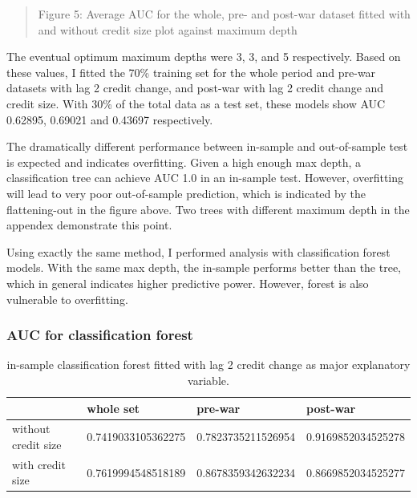\documentclass{article}
\newcommand{\ciapdf}[1]{\vspace*{-\parskip}\begin{center}\resizebox{0.75\textwidth}{!}{\texttt{[image: \#1]}}\end{center}}
\begin{document}
\ciapdf{Figure_6.pdf}
\begin{quote}
Figure 5: Average AUC for the whole, pre- and post-war dataset fitted
with and without credit size plot against maximum depth
\end{quote}

The eventual optimum maximum depths were 3, 3, and 5 respectively.
Based on these values, I fitted the 70\% training set for the whole period and
pre-war datasets with lag 2 credit change, and post-war with lag 2 credit
change and credit size. With 30\% of the total data as a test set, these models show AUC 0.62895,
0.69021 and 0.43697 respectively.

The dramatically different performance between in-sample and
out-of-sample test is expected and indicates overfitting. Given a high enough
max depth, a classification tree can achieve AUC 1.0 in an in-sample test.
However, overfitting will lead to very poor out-of-sample prediction, which
is indicated by the flattening-out in the figure above. Two trees with different maximum depth in the appendex demonstrate
this point.

Using exactly the same method, I performed analysis with classification forest
models. With the same max depth, the in-sample performs better than the tree,
which in general indicates higher predictive power. However, forest is also
vulnerable to overfitting.

\subsubsection*{\centering{}AUC for classification forest}


\begin{table}[H]
    \caption{in-sample classification forest fitted with lag 2 credit change
    as major explanatory variable.}
    \begin{center}\begin{tabular}{|l|l|l|l|}
    \hline
                        & whole set          & pre-war            & post-war           \\ \hline
    without credit size & 0.7419033105362275 & 0.7823735211526954 & 0.9169852034525278 \\ \hline
    with credit size    & 0.7619994548518189 & 0.8678359342632234 & 0.8669852034525277 \\ \hline
    \end{tabular}\end{center}
\end{table}
\end{document}
